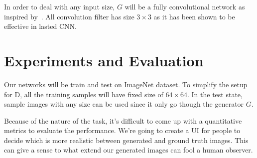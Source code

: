 \documentclass[10pt,twocolumn,letterpaper]{article}
\begin{document}
In order to deal with any input size, $G$ will be a fully convolutional network as inspired by~\cite{long2015fully}. All convolution filter has size $3 \times 3$ as it has been shown to be effective in lasted CNN.

\section{Experiments and Evaluation}
Our networks will be train and test on ImageNet dataset. To simplify the setup for D, all the training samples will have fixed size of $64\times 64$. In the test state, sample images with any size can be used since it only go though the generator $G$.

Because of the nature of the task, it's difficult to come up with a quantitative metrics to evaluate the performance. We're going to create a UI for people to decide which is more realistic between generated and ground truth images. This can give a sense to what extend our generated images can fool a human observer.



{\small


}
\end{document}
